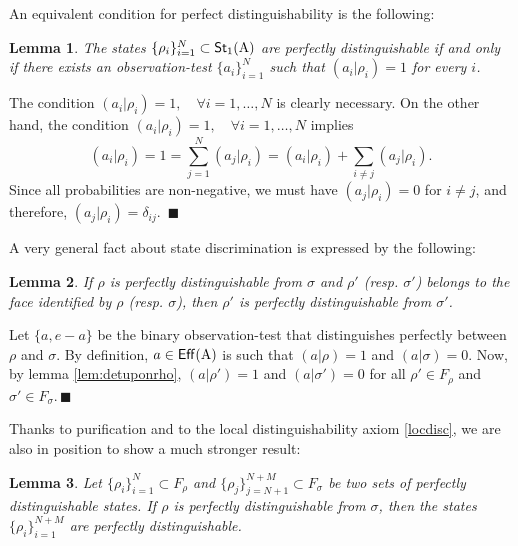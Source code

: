 \documentclass[12pt,aps,pra,showpacs,groupedaddress]{revtex4-1}
\newtheorem{lemma}{Lemma} \newtheorem{proposition}{Proposition}
\def\Proof{\medskip\par\noindent{\bf Proof. }}
\def\qed{$\,\blacksquare$\par}
\def\Cntset{{\mathsf{Eff}}}
\def\Stset{{\mathsf{St}}}
\def\SC#1#2{\left(#1\right|\left.\!#2\right)}  \def\Tr{{\rm Tr}}
\begin{document}
An equivalent condition for perfect distinguishability is the following:

\begin{lemma}\label{lem:simpler}
  The states $\{\rho_i\}_{i=1}^N \subset \Stset_1 (\rA)$ are perfectly distinguishable if and only
  if there exists an observation-test $\{a_i\}_{i=1}^N$ such that $(a_i|\rho_i)=1$ for every $i$.
\end{lemma}

\Proof The condition $\SC {a_i} {\rho_i}  =1, \quad \forall i =1, \dots, N$  is clearly necessary. On the other hand, the condition $\SC {a_i} {\rho_i}  =1, \quad \forall i =1, \dots, N$ implies 
\begin{equation*}
  (a_i|\rho_i)= 1=\sum_{j=1}^N(a_j|\rho_i)=(a_i|\rho_i)+\sum_{i\neq j}(a_j|\rho_i).
\end{equation*}
Since all probabilities are non-negative, we must have $(a_j|\rho_i)=0$ for $i\neq j$, and therefore, $(a_j|\rho_i)=\delta_{ij}$. \qed


A very general fact about state discrimination is expressed by the following:
\begin{lemma}
 If $\rho$ is perfectly distinguishable from $\sigma$ and $\rho' $ (resp. $\sigma'$) belongs to the
 face identified by $\rho$ (resp.  $\sigma$), then $\rho'$ is perfectly distinguishable from
 $\sigma'$.
  \label{lem:inclusiondiscrimination}
\end{lemma}

\Proof Let $\{a, e- a\}$ be the binary observation-test that distinguishes perfectly between $\rho$ and $\sigma$.  By definition, $a\in\Cntset(\rA)$ is such that $(a|\rho)=1$ and $(a|\sigma)=0$.
Now, by lemma \ref{lem:detuponrho}, $(a|\rho')=1$ and $(a|\sigma')=0$ for all $\rho'\in F_\rho$ and
$\sigma'\in F_\sigma$.\qed


Thanks to purification and to the local distinguishability axiom \ref{locdisc}, we are also in position to show a much stronger result: 

\begin{lemma}\label{lem:refinement}
  Let $\{\rho_i\}_{i=1}^N \subset F_\rho$ and
  $\{\rho_j\}_{j=N+1}^{N+M} \subset F_\sigma$ be two sets of
  perfectly distinguishable states. 
   If $\rho$ is perfectly distinguishable from $\sigma$, then the states $\{\rho_i\}_{i=1}^{N+M}$ are perfectly
  distinguishable.
\end{lemma}
\end{document}

